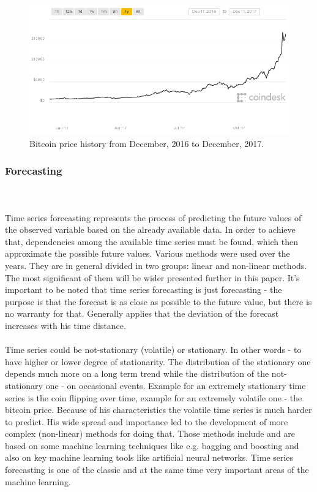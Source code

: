 \documentclass[runningheads,a4paper]{llncs}[2015/06/24]
\begin{document}
\begin{figure}[h]
\centering
\includegraphics[width=\textwidth]{bitcoin}
\caption{Bitcoin price history from December,  2016 to December, 2017.}
\label{fig:bitcoin}
\end{figure}

		\subsubsection{Forecasting} \hspace{1cm}\\\\Time series forecasting represents the process of predicting the future values of the observed variable based on the already available data. In order to achieve that, dependencies among the available time series must be found, which then approximate the possible future values. Various methods were used over the years. They are in general divided  in two groups: linear and non-linear methods. The most significant of them will be wider presented  further in this paper. It's important to be noted that time series forecasting is just forecasting - the purpose is that the forecast is as close as possible to the future value, but there is no warranty for that. Generally applies that the deviation of the forecast increases with his time distance.\\\\ Time series could be not-stationary (volatile) or stationary. In other words - to have higher or lower degree of stationarity. The distribution of the stationary one depends much more on a long term trend while the distribution of the not-stationary one - on occasional events. Example for an extremely stationary time series is the coin flipping over time, example for an extremely volatile one - the bitcoin price. Because of his characteristics the volatile time series is much harder to predict. His wide spread and importance led to the development of more complex (non-linear) methods for doing that. Those methods include and are based on some machine learning techniques like e.g. bagging and boosting and also on key machine learning tools like artificial neural networks. Time series forecasting is one of the classic and at the same time very important areas of the machine learning.
\end{document}
